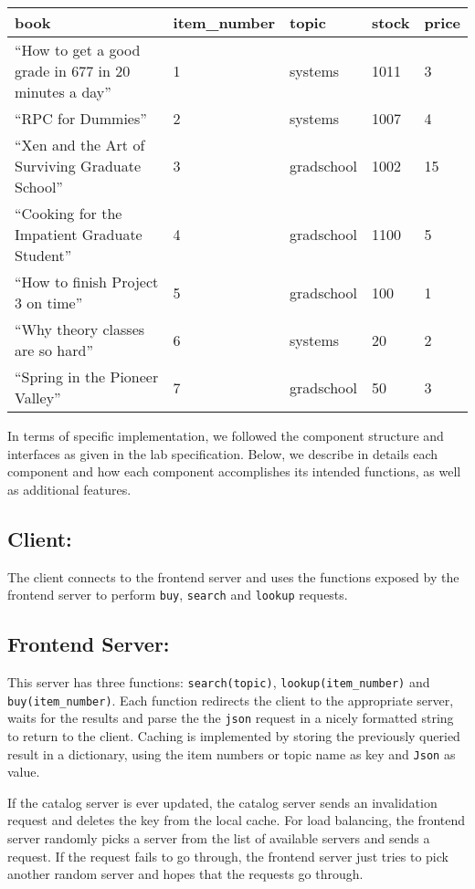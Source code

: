 \documentclass[11pt,]{article}
\begin{document}
\begin{longtable}[]{@{}lllll@{}}
\toprule
book & item\_number & topic & stock & price\tabularnewline
\midrule
\endhead
``How to get a good grade in 677 in 20 minutes a day'' & 1 & systems &
1011 & 3\tabularnewline
``RPC for Dummies'' & 2 & systems & 1007 & 4\tabularnewline
``Xen and the Art of Surviving Graduate School'' & 3 & gradschool & 1002
& 15\tabularnewline
``Cooking for the Impatient Graduate Student'' & 4 & gradschool & 1100 &
5\tabularnewline
``How to finish Project 3 on time'' & 5 & gradschool & 100 &
1\tabularnewline
``Why theory classes are so hard'' & 6 & systems & 20 & 2\tabularnewline
``Spring in the Pioneer Valley'' & 7 & gradschool & 50 &
3\tabularnewline
\bottomrule
\end{longtable}

\noindent In terms of specific implementation, we followed the component
structure and interfaces as given in the lab specification. Below, we
describe in details each component and how each component accomplishes
its intended functions, as well as additional features.

\hypertarget{client}{%
\subsection{Client:}\label{client}}

The client connects to the frontend server and uses the functions
exposed by the frontend server to perform \texttt{buy}, \texttt{search}
and \texttt{lookup} requests.

\hypertarget{frontend-server}{%
\subsection{Frontend Server:}\label{frontend-server}}

This server has three functions: \texttt{search(topic)},
\texttt{lookup(item\_number)} and \texttt{buy(item\_number)}. Each
function redirects the client to the appropriate server, waits for the
results and parse the the \texttt{json} request in a nicely formatted
string to return to the client. Caching is implemented by storing the
previously queried result in a dictionary, using the item numbers or
topic name as key and \texttt{Json} as value.

If the catalog server is ever updated, the catalog server sends an
invalidation request and deletes the key from the local cache. For load
balancing, the frontend server randomly picks a server from the list of
available servers and sends a request. If the request fails to go
through, the frontend server just tries to pick another random server
and hopes that the requests go through.
\end{document}
